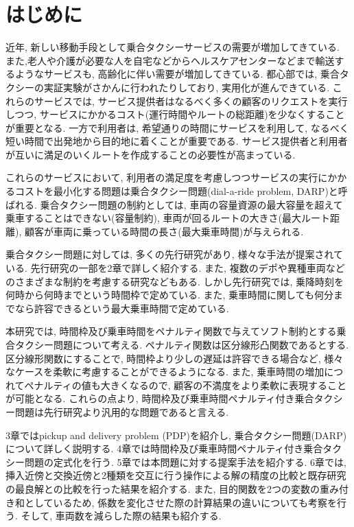 \chapter{はじめに}
近年, 新しい移動手段として乗合タクシーサービスの需要が増加してきている. また,老人や介護が必要な人を自宅などからヘルスケアセンターなどまで輸送するようなサービスも, 高齢化に伴い需要が増加してきている.
都心部では, 乗合タクシーの実証実験がさかんに行われたりしており, 実用化が進んできている. これらのサービスでは, サービス提供者はなるべく多くの顧客のリクエストを実行しつつ, サービスにかかるコスト(運行時間やルートの総距離)を少なくすることが重要となる. 一方で利用者は, 希望通りの時間にサービスを利用して, なるべく短い時間で出発地から目的地に着くことが重要である. サービス提供者と利用者が互いに満足のいくルートを作成することの必要性が高まっている.

これらのサービスにおいて, 利用者の満足度を考慮しつつサービスの実行にかかるコストを最小化する問題は乗合タクシー問題(dial-a-ride problem, DARP)と呼ばれる.
乗合タクシー問題の制約としては, 車両の容量資源の最大容量を超えて乗車することはできない(容量制約), 車両が回るルートの大きさ(最大ルート距離), 顧客が車両に乗っている時間の長さ(最大乗車時間)が与えられる.

乗合タクシー問題に対しては, 多くの先行研究があり, 様々な手法が提案されている. 先行研究の一部を2章で詳しく紹介する. また, 複数のデポや異種車両などのさまざまな制約を考慮する研究などもある. しかし先行研究では, 乗降時刻を何時から何時までという時間枠で定めている. また, 乗車時間に関しても何分までなら許容できるという最大乗車時間で定めている.

本研究では, 時間枠及び乗車時間をペナルティ関数で与えてソフト制約とする乗合タクシー問題について考える. ペナルティ関数は区分線形凸関数であるとする. 区分線形関数にすることで, 時間枠より少しの遅延は許容できる場合など, 様々なケースを柔軟に考慮することができるようになる. また, 乗車時間の増加につれてペナルティの値も大きくなるので, 顧客の不満度をより柔軟に表現することが可能となる. これらの点より, 時間枠及び乗車時間ペナルティ付き乗合タクシー問題は先行研究より汎用的な問題であると言える.

3章ではpickup and delivery problem (PDP)を紹介し, 乗合タクシー問題(DARP)について詳しく説明する. 4章では時間枠及び乗車時間ペナルティ付き乗合タクシー問題の定式化を行う. 5章では本問題に対する提案手法を紹介する.
6章では, 挿入近傍と交換近傍と2種類を交互に行う操作による解の精度の比較と既存研究の最良解との比較を行った結果を紹介する. また, 目的関数を2つの変数の重み付き和としているため, 係数を変化させた際の計算結果の違いについても考察を行う. そして, 車両数を減らした際の結果も紹介する.
